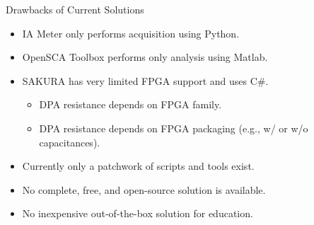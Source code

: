 \documentclass[xcolor=pdftex,dvipsnames,table,final]{beamer}
\begin{document}
\begin{frame}[fragile]{}
\begin{columns}[t]
\begin{column}{.31\linewidth}
\begin{block}{Drawbacks of Current Solutions}
\begin{itemize}
              \item IA Meter only performs acquisition using Python.
              \item OpenSCA Toolbox performs only analysis using Matlab.
              \item SAKURA has very limited FPGA support and uses C\#.
              \begin{itemize}
                \item DPA resistance depends on FPGA family.
                \item DPA resistance depends on FPGA packaging (e.g., w/ or w/o capacitances).
              \end{itemize}
              \item Currently only a patchwork of scripts and tools exist.
              \item No complete, free, and open-source solution is available.
              \item No inexpensive out-of-the-box solution for education.
            \end{itemize}
          \end{block}
        
    \end{column}
    \begin{column}{.31\linewidth}
   
      

\end{column}
\end{columns}
\end{frame}
\end{document}
